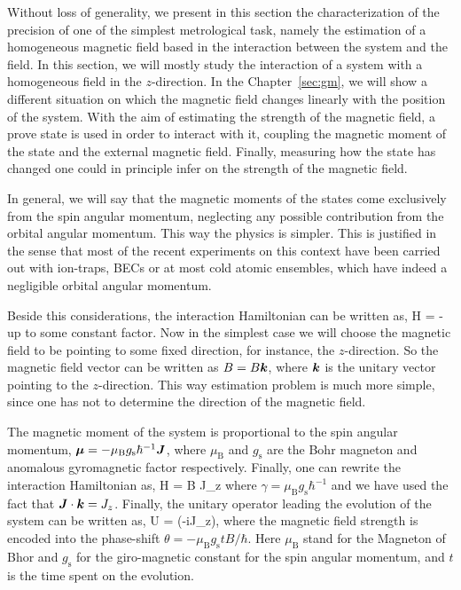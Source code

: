 Without loss of generality, we present in this section the characterization of the precision of one of the simplest metrological task, namely the estimation of a homogeneous magnetic field based in the interaction between the system and the field.
In this section, we will mostly study the interaction of a system with a homogeneous field in the $z$-direction.
In the Chapter~\ref{sec:gm}, we will show a different situation on which the magnetic field changes linearly with the position of the system.
With the aim of estimating the strength of the magnetic field, a prove state is used in order to interact with it, coupling the magnetic moment of the state and the external magnetic field.
Finally, measuring how the state has changed one could in principle infer on the strength of the magnetic field.

In general, we will say that the magnetic moments of the states come exclusively from the spin angular momentum, neglecting any possible contribution from the orbital angular momentum.
This way the physics is simpler.
This is justified in the sense that most of the recent experiments on this context have been carried out with ion-traps, BECs or at most cold atomic ensembles, which have indeed a negligible orbital angular momentum.

Beside this considerations, the interaction Hamiltonian can be written as,
\be
  H = - \bs{\mu} \cdot {}
\ee
up to some constant factor.
Now in the simplest case we will choose the magnetic field to be pointing to some fixed direction, for instance, the $z$-direction.
So the magnetic field vector can be written as ${B}=B\boldsymbol{k}$, where $\boldsymbol{k}$ is the unitary vector pointing to the $z$-direction.
This way estimation problem is much more simple, since one has not to determine the direction of the magnetic field.

The magnetic moment of the system is proportional to the spin angular momentum, $\boldsymbol{\mu}=-\mu_\text{B} g_{\text{s}}\hbar^{-1} \boldsymbol{J}$, where $\mu_{\text{B}}$ and $g_{\text{s}}$ are the Bohr magneton and anomalous gyromagnetic factor respectively.
Finally, one can rewrite the interaction Hamiltonian as,
\be
  \label{eq:bg-hamiltonian-homogeneous-field}
  H = \gamma B J_z
\ee
where $\gamma = \mu_\text{B} g_{\text{s}}\hbar^{-1}$ and we have used the fact that $\boldsymbol{J}\cdot\boldsymbol{k}=J_z$.
Finally, the unitary operator leading the evolution of the system can be written as,
\be
  \label{eq:bg-unitary-homogeneous-field}
  U = \exp(-i\theta J_z),
\ee
where the magnetic field strength is encoded into the phase-shift $\theta=-\mu_\text{B} g_\text{s} t B/\hbar$.
Here $\mu_\text{B}$ stand for the Magneton of Bhor and $g_\text{s}$ for the giro-magnetic constant for the spin angular momentum, and $t$ is the time spent on the evolution.

